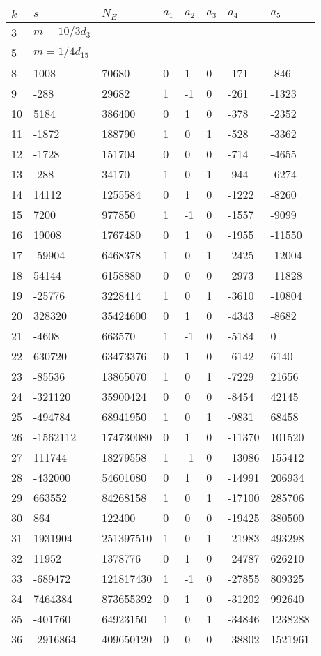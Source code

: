 \documentclass{amsart}
\begin{document}
\begin{longtable}{|l|l|l|lllll|}
\hline
$k$ & $s$ & $N_E$ & $a_1$ & $a_2$ & $a_3$ & $a_4$ & $a_5$\\
\hline
3&$m=10/3d_{3}$&&\multicolumn{5}{c|}{}\\
5&$m=1/4d_{15}$&&\multicolumn{5}{c|}{}\\
8&1008&70680&0&1&0&-171&-846\\
9&-288&29682&1&-1&0&-261&-1323\\
10&5184&386400&0&1&0&-378&-2352\\
11&-1872&188790&1&0&1&-528&-3362\\
12&-1728&151704&0&0&0&-714&-4655\\
13&-288&34170&1&0&1&-944&-6274\\
14&14112&1255584&0&1&0&-1222&-8260\\
15&7200&977850&1&-1&0&-1557&-9099\\
16&19008&1767480&0&1&0&-1955&-11550\\
17&-59904&6468378&1&0&1&-2425&-12004\\
18&54144&6158880&0&0&0&-2973&-11828\\
19&-25776&3228414&1&0&1&-3610&-10804\\
20&328320&35424600&0&1&0&-4343&-8682\\
21&-4608&663570&1&-1&0&-5184&0\\
22&630720&63473376&0&1&0&-6142&6140\\
23&-85536&13865070&1&0&1&-7229&21656\\
24&-321120&35900424&0&0&0&-8454&42145\\
25&-494784&68941950&1&0&1&-9831&68458\\
26&-1562112&174730080&0&1&0&-11370&101520\\
27&111744&18279558&1&-1&0&-13086&155412\\
28&-432000&54601080&0&1&0&-14991&206934\\
29&663552&84268158&1&0&1&-17100&285706\\
30&864&122400&0&0&0&-19425&380500\\
31&1931904&251397510&1&0&1&-21983&493298\\
32&11952&1378776&0&1&0&-24787&626210\\
33&-689472&121817430&1&-1&0&-27855&809325\\
34&7464384&873655392&0&1&0&-31202&992640\\
35&-401760&64923150&1&0&1&-34846&1238288\\
36&-2916864&409650120&0&0&0&-38802&1521961\\

\end{longtable}
\end{document}
